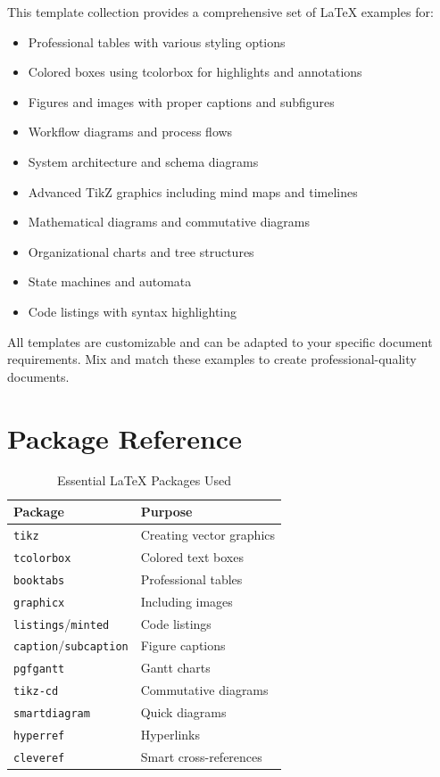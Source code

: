 \documentclass[a4paper,12pt]{article}
\begin{document}
This template collection provides a comprehensive set of LaTeX examples for:
\begin{itemize}
    \item Professional tables with various styling options
    \item Colored boxes using tcolorbox for highlights and annotations
    \item Figures and images with proper captions and subfigures
    \item Workflow diagrams and process flows
    \item System architecture and schema diagrams
    \item Advanced TikZ graphics including mind maps and timelines
    \item Mathematical diagrams and commutative diagrams
    \item Organizational charts and tree structures
    \item State machines and automata
    \item Code listings with syntax highlighting
\end{itemize}

All templates are customizable and can be adapted to your specific document 
requirements. Mix and match these examples to create professional-quality 
documents.

\appendix
\section{Package Reference}

\begin{table}[H]
\centering
\caption{Essential LaTeX Packages Used}
\label{tab:packages}
\begin{tabular}{ll}
\toprule
\textbf{Package} & \textbf{Purpose} \\
\midrule
\texttt{tikz} & Creating vector graphics \\
\texttt{tcolorbox} & Colored text boxes \\
\texttt{booktabs} & Professional tables \\
\texttt{graphicx} & Including images \\
\texttt{listings}/\texttt{minted} & Code listings \\
\texttt{caption}/\texttt{subcaption} & Figure captions \\
\texttt{pgfgantt} & Gantt charts \\
\texttt{tikz-cd} & Commutative diagrams \\
\texttt{smartdiagram} & Quick diagrams \\
\texttt{hyperref} & Hyperlinks \\
\texttt{cleveref} & Smart cross-references \\
\bottomrule
\end{tabular}
\end{table}

% 
% 
\end{document}
